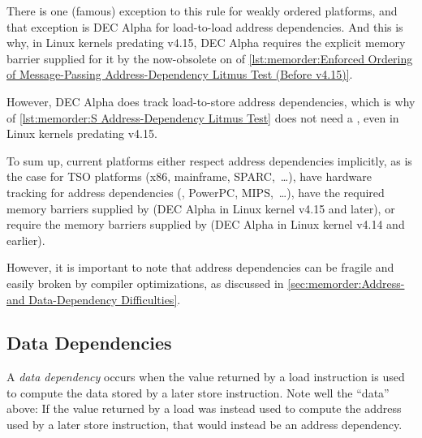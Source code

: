 {{	\begin{fcvref}
	There is one (famous) exception to this rule for weakly ordered
	platforms, and that exception is DEC Alpha for load-to-load
	address dependencies.
	And this is why, in Linux kernels predating v4.15, DEC Alpha
	requires the explicit memory barrier supplied for it by the
	now-obsolete  on  of
	\cref{lst:memorder:Enforced Ordering of Message-Passing Address-Dependency Litmus Test (Before v4.15)}.
	\end{fcvref}
	\begin{fcvref}
	However, DEC Alpha does track load-to-store address dependencies,
	which is why  of
	\cref{lst:memorder:S Address-Dependency Litmus Test}
	does not need a , even in Linux
	kernels predating v4.15.
	\end{fcvref}

	To sum up, current platforms either respect address dependencies
	implicitly, as is the case for TSO platforms (x86, mainframe,
	SPARC,~\dots), have hardware tracking for address dependencies
	(\ARM, PowerPC, MIPS,~\dots), have the required memory barriers
	supplied by  (DEC Alpha in Linux kernel v4.15 and
	later), or require the memory barriers supplied by
	 (DEC Alpha in Linux kernel v4.14 and earlier).
}\QuickQuizEndB
%
\QuickQuizEndE
}

However, it is important to note that address dependencies can
be fragile and easily broken by compiler optimizations, as discussed in
\cref{sec:memorder:Address- and Data-Dependency Difficulties}.

\subsection{Data Dependencies}
\label{sec:memorder:Data Reordering}

A \emph{data dependency} occurs when the value returned by a load
instruction is used to compute the data stored by a later store
instruction.
Note well the ``data'' above: If the value returned by a load
was instead used to compute the address used by a later store
instruction, that would instead be an address dependency.


